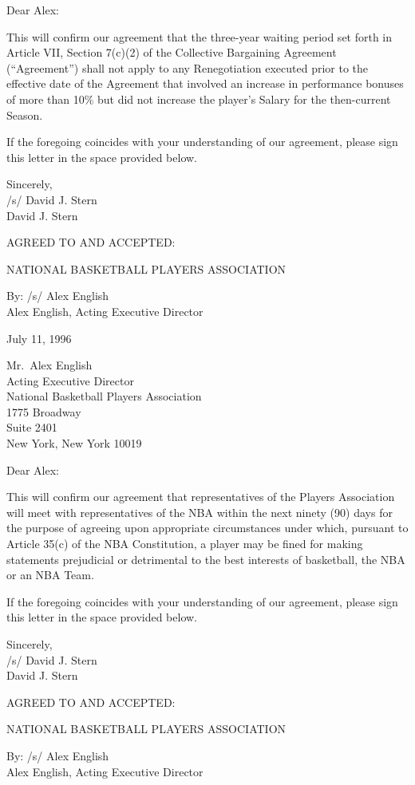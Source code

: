 \documentclass[
]{book}
\begin{document}
Dear Alex:

This will confirm our agreement that the three-year waiting period set forth in Article VII, Section 7(c)(2) of the Collective Bargaining Agreement (``Agreement'') shall not apply to any Renegotiation executed prior to the effective date of the Agreement that involved an increase in performance bonuses of more than 10\% but did not increase the player's Salary for the then-current Season.

If the foregoing coincides with your understanding of our agreement, please sign this letter in the space provided below.

Sincerely,\\
/s/ David J. Stern\\
David J. Stern

AGREED TO AND ACCEPTED:

NATIONAL BASKETBALL PLAYERS ASSOCIATION

By:
/s/ Alex English\\
Alex English, Acting Executive Director

\newpage

July 11, 1996

Mr.~Alex English\\
Acting Executive Director\\
National Basketball Players Association\\
1775 Broadway\\
Suite 2401\\
New York, New York 10019

Dear Alex:

This will confirm our agreement that representatives of the Players Association will meet with representatives of the NBA within the next ninety (90) days for the purpose of agreeing upon appropriate circumstances under which, pursuant to Article 35(c) of the NBA Constitution, a player may be fined for making statements prejudicial or detrimental to the best interests of basketball, the NBA or an NBA Team.

If the foregoing coincides with your understanding of our agreement, please sign this letter in the space provided below.

Sincerely,\\
/s/ David J. Stern\\
David J. Stern

AGREED TO AND ACCEPTED:

NATIONAL BASKETBALL PLAYERS ASSOCIATION

By:
/s/ Alex English\\
Alex English, Acting Executive Director
\end{document}
